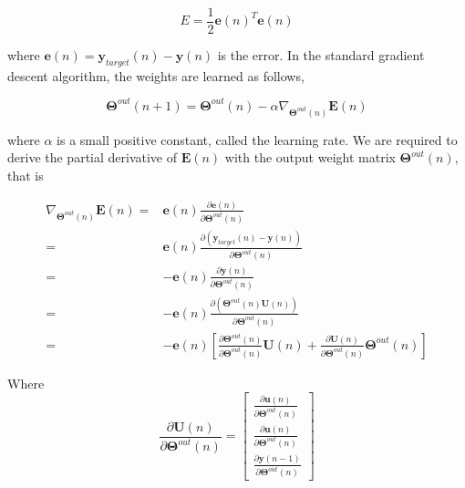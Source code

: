\documentclass{WitsPhysicsReport}
\begin{document}
\begin{equation}
    E = \frac{1}{2} \mathbf{e}(n)^{T} \mathbf{e}(n)
    \label{equ:gradient_descent_error}
\end{equation}

where $\mathbf{e}(n) = \mathbf{y}_{target}(n) - \mathbf{y}(n)$ is the error. In the standard  gradient descent algorithm, the weights are learned as follows,

\begin{equation}
    \mathbf{\Theta}^{out}(n+1) = \mathbf{\Theta}^{out}(n) - \alpha \nabla_{\mathbf{\Theta}^{out} (n)} \mathbf{E}(n)
     \label{equ:gradient_descent}
\end{equation}

where $\alpha$ is a small positive constant, called the learning rate. We are required to derive the partial derivative of $\mathbf{E}(n)$ with the output weight matrix $\mathbf{\Theta}^{out}(n)$, that is


\begin{equation}
\begin{split}
\nabla_{\mathbf{\Theta}^{out} (n)} \mathbf{E}(n) =& \mathbf{e}(n) \frac{\partial \mathbf{e}(n)}{\partial \mathbf{\Theta}^{out}(n)} \\
=&\mathbf{e}(n) \frac{\partial (\mathbf{y}_{target}(n) - \mathbf{y}(n) )}{\partial \mathbf{\Theta}^{out}(n)}\\
=&-\mathbf{e}(n) \frac{\partial  \mathbf{y}(n)}{\partial \mathbf{\Theta}^{out}(n)} \\
=&-\mathbf{e}(n) \frac{\partial (\mathbf{\Theta}^{out}(n) \mathbf{U}(n))  }{\partial \mathbf{\Theta}^{out}(n)}\\
=& -\mathbf{e}(n) [\frac{\partial \mathbf{\Theta}^{out}(n)}{\partial \mathbf{\Theta}^{out}(n)} \mathbf{U}(n) +  \frac{\partial \mathbf{U}(n) }{\partial \mathbf{\Theta}^{out}(n)} \mathbf{\Theta}^{out}(n) ]
\end{split}
\label{equ:gradient_descent_derivation}
\end{equation}

Where 
\begin{equation}
\frac{\partial \mathbf{U} (n)}{\partial \mathbf{\Theta}^{out} (n)}  =
\begin{bmatrix}
\frac{\partial \mathbf{u}(n)}  {\partial \mathbf{\Theta}^{out}(n)} \\
\frac{\partial \mathbf{u}(n)} {\partial \mathbf{\Theta}^{out}(n)} \\
\frac{\partial \mathbf{y}(n-1)}{\partial \mathbf{\Theta}^{out}(n)} 
\end{bmatrix}
\end{equation}
\end{document}
